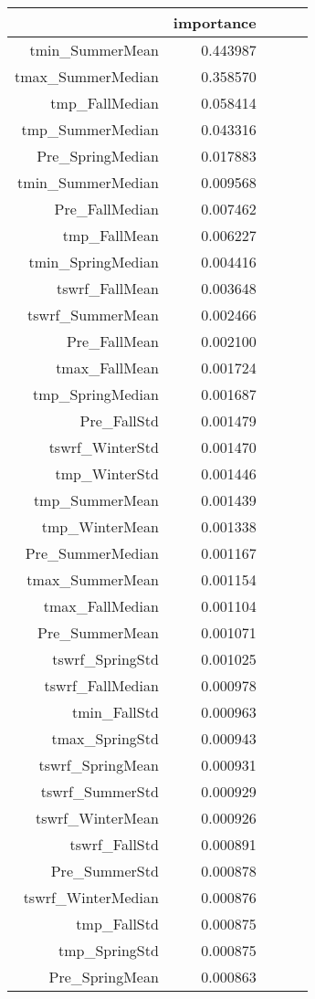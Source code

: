 \begin{tabular}{rrrrr}
\toprule
 & importance \\
\midrule
tmin_SummerMean & 0.443987 \\
tmax_SummerMedian & 0.358570 \\
tmp_FallMedian & 0.058414 \\
tmp_SummerMedian & 0.043316 \\
Pre_SpringMedian & 0.017883 \\
tmin_SummerMedian & 0.009568 \\
Pre_FallMedian & 0.007462 \\
tmp_FallMean & 0.006227 \\
tmin_SpringMedian & 0.004416 \\
tswrf_FallMean & 0.003648 \\
tswrf_SummerMean & 0.002466 \\
Pre_FallMean & 0.002100 \\
tmax_FallMean & 0.001724 \\
tmp_SpringMedian & 0.001687 \\
Pre_FallStd & 0.001479 \\
tswrf_WinterStd & 0.001470 \\
tmp_WinterStd & 0.001446 \\
tmp_SummerMean & 0.001439 \\
tmp_WinterMean & 0.001338 \\
Pre_SummerMedian & 0.001167 \\
tmax_SummerMean & 0.001154 \\
tmax_FallMedian & 0.001104 \\
Pre_SummerMean & 0.001071 \\
tswrf_SpringStd & 0.001025 \\
tswrf_FallMedian & 0.000978 \\
tmin_FallStd & 0.000963 \\
tmax_SpringStd & 0.000943 \\
tswrf_SpringMean & 0.000931 \\
tswrf_SummerStd & 0.000929 \\
tswrf_WinterMean & 0.000926 \\
tswrf_FallStd & 0.000891 \\
Pre_SummerStd & 0.000878 \\
tswrf_WinterMedian & 0.000876 \\
tmp_FallStd & 0.000875 \\
tmp_SpringStd & 0.000875 \\
Pre_SpringMean & 0.000863 \\

\end{tabular}
